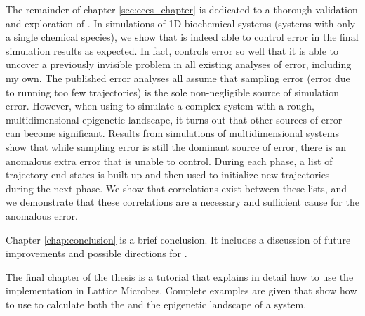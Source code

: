 The remainder of chapter \ref{sec:eces_chapter} is dedicated to a thorough validation and exploration of . In simulations of 1D biochemical systems (\ie systems with only a single chemical species), we show that  is indeed able to control error in the final simulation results as expected. In fact,  controls error so well that it is able to uncover a previously invisible problem in all existing analyses of  error, including my own. The published error analyses\supercite{Allen:2006ch,Borrero:2008il,Allen:2009kb} all assume that sampling error (\ie error due to running too few trajectories) is the sole non-negligible source of simulation error. However, when using  to simulate a complex system with a rough, multidimensional epigenetic landscape, it turns out that other sources of error can become significant. Results from  simulations of multidimensional systems show that while sampling error is still the dominant source of error, there is an anomalous extra error that  is unable to control. During each phase, a list of trajectory end states is built up and then used to initialize new trajectories during the next phase. We show that correlations exist between these lists, and we demonstrate that these correlations are a necessary and sufficient cause for the anomalous error.

Chapter \ref{chap:conclusion} is a brief conclusion. It includes a discussion of future improvements and possible directions for .

The final chapter of the thesis is a tutorial that explains in detail how to use the  implementation in Lattice Microbes. Complete examples are given that show how to use  to calculate both the  and the epigenetic landscape of a system.







